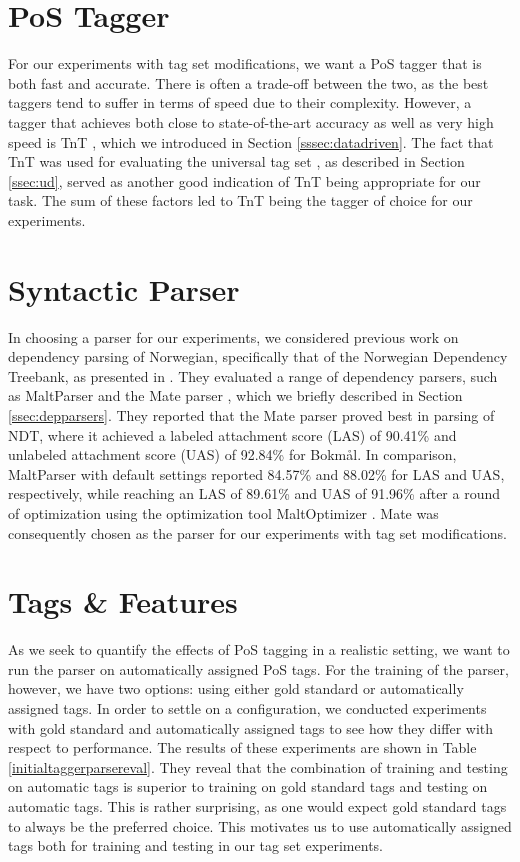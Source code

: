 \documentclass[a4paper,12pt,english]{book}
\begin{document}
\section{PoS Tagger}
For our experiments with tag set modifications, we want a PoS tagger that is
both fast and accurate. There is often a trade-off between the two, as the best
taggers tend to suffer in terms of speed due to their complexity. However, a
tagger that achieves both close to state-of-the-art accuracy as well as very
high speed is TnT \cite{Bra:00}, which we introduced in Section
\ref{sssec:datadriven}. The fact that TnT was used for evaluating the universal
tag set \cite{Pet:Das:McD:12}, as described in Section \ref{ssec:ud}, served as
another good indication of TnT being appropriate for our task. The sum of these
factors led to TnT being the tagger of choice for our experiments.

\section{Syntactic Parser}
In choosing a parser for our experiments, we considered previous work on
dependency parsing of Norwegian, specifically that of the Norwegian Dependency
Treebank, as presented in . They evaluated a range of
dependency parsers, such as MaltParser \cite{Niv:Hal:Nil:07} and the Mate
parser \cite{Boh:10}, which we briefly described in Section
\ref{ssec:depparsers}. They reported that the Mate parser proved best in
parsing of NDT, where it achieved a labeled attachment score (LAS) of 90.41\%
and unlabeled attachment score (UAS) of 92.84\% for Bokmål. In comparison,
MaltParser with default settings reported 84.57\% and 88.02\% for LAS and UAS,
respectively, while reaching an LAS of 89.61\% and UAS of 91.96\% after a round
of optimization using the optimization tool MaltOptimizer \cite{Bal:Niv:12}.
Mate was consequently chosen as the parser for our experiments with tag set
modifications.

\section{Tags \& Features}
\label{sec:tagsandfeatures}
As we seek to quantify the effects of PoS tagging in a realistic setting, we
want to run the parser on automatically assigned PoS tags. For the training of
the parser, however, we have two options: using either gold standard or
automatically assigned tags. In order to settle on a configuration, we
conducted experiments with gold standard and automatically assigned tags to see
how they differ with respect to performance. The results of these experiments
are shown in Table \ref{initialtaggerparsereval}.  They reveal that the
combination of training and testing on automatic tags is superior to training
on gold standard tags and testing on automatic tags. This is rather surprising,
as one would expect gold standard tags to always be the preferred choice. This
motivates us to use automatically assigned tags both for training and testing
in our tag set experiments.
\end{document}
